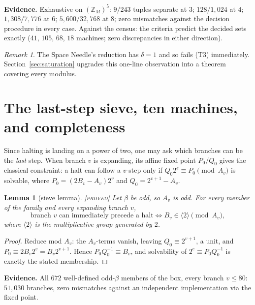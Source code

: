 \documentclass[11pt]{article}
\newtheorem{lemma}[theorem]{Lemma}
\theoremstyle{definition}
\theoremstyle{remark}
\newtheorem{remark}[theorem]{Remark}
\newenvironment{evidence}
  {\par\smallskip\noindent\footnotesize\textbf{Evidence.}}
  {\par\smallskip}
\newcommand{\Z}{\mathbb{Z}}
\newcommand{\Proved}{\textsc{[proved]}}
\begin{document}
\begin{evidence}
Exhaustive on $(\Z_M)^5$: $9/243$ tuples separate at $3$; $128/1{,}024$ at $4$;
$1{,}308/7{,}776$ at $6$; $5{,}600/32{,}768$ at $8$; zero mismatches against
the decision procedure in every case.  Against the census: the criteria predict
the decided sets exactly ($41$, $105$, $68$, $18$ machines; zero discrepancies
in either direction).
\end{evidence}

\begin{remark}
The Space Needle's reduction has $\delta=1$ and so fails (T3) immediately.
Section~\ref{sec:saturation} upgrades this one-line observation into a theorem
covering every modulus.
\end{remark}

\section{The last-step sieve, ten machines, and completeness}
\label{sec:sieve}

Since halting is landing on a power of two, one may ask which branches can be
the \emph{last} step.  When branch $v$ is expanding, its affine fixed point
$P_0/Q_0$ gives the classical constraint: a halt can follow a $v$-step only if
$Q_0 2^{e}\equiv P_0 \pmod{A_v}$ is solvable, where
$P_0=(2B_v-A_v)2^{v}$ and $Q_0=2^{v+1}-A_v$.

\begin{lemma}[sieve lemma]\label{lem:universal}
\Proved{}\; Let $\beta$ be odd, so $A_v$ is odd.  For every member of the
family and every expanding branch $v$,
\[
\text{branch $v$ can immediately precede a halt}
\iff B_v\in\langle2\rangle \pmod{A_v},
\]
where $\langle2\rangle$ is the multiplicative group generated by $2$.
\end{lemma}

\begin{proof}
Reduce mod $A_v$: the $A_v$-terms vanish, leaving $Q_0\equiv2^{v+1}$, a unit,
and $P_0\equiv 2B_v2^{v}=B_v2^{v+1}$.  Hence $P_0Q_0^{-1}\equiv B_v$, and
solvability of $2^{e}\equiv P_0Q_0^{-1}$ is exactly the stated membership.
\end{proof}

\begin{evidence}
All $672$ well-defined odd-$\beta$ members of the box, every branch $v\le80$:
$51{,}030$ branches, zero mismatches against an independent implementation via
the fixed point.
\end{evidence}
\end{document}
